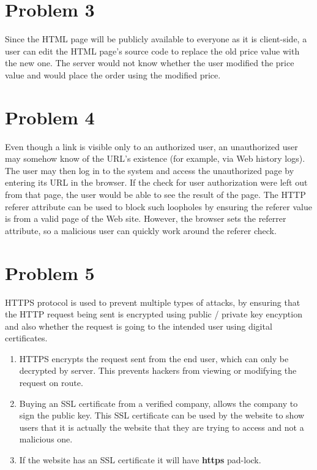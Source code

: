 \documentclass{article}
\begin{document}
\section{Problem 3}
Since the HTML page will be publicly available to everyone as it is client-side, a user can edit the HTML page's source code to replace the old price value with the new one. The server would not know whether the user modified the price value and would place the order using the modified price.

\section{Problem 4}
Even though a link is visible only to an authorized user, an unauthorized user may somehow know of the URL's existence (for example, via Web history logs). The user may then log in to the system and access the unauthorized page by entering its URL in the browser. If the check for user authorization were left out from that page, the user would be able to see the result of the page. The HTTP referer attribute can be used to block such loopholes by ensuring the referer value is from a valid page of the Web site. However, the browser sets the referrer attribute, so a malicious user can quickly work around the referer check.

\section{Problem 5}
HTTPS protocol is used to prevent multiple types of attacks, by ensuring that
the HTTP request being sent is encrypted using public / private key encyption
and also whether the request is going to the intended user using digital certificates.

\begin{enumerate}
  \item HTTPS encrypts the request sent from the end user, which can only be decrypted by 
        server. This prevents hackers from viewing or modifying the request on route.
  \item Buying an SSL certificate from a verified company, allows the company to sign the public key.
        This SSL certificate can be used by the website to show users that it is actually the website that they are trying to access and not a malicious one.
        
  \item If the website has an SSL certificate it will have \textbf{https} pad-lock.

\end{enumerate}
\end{document}
